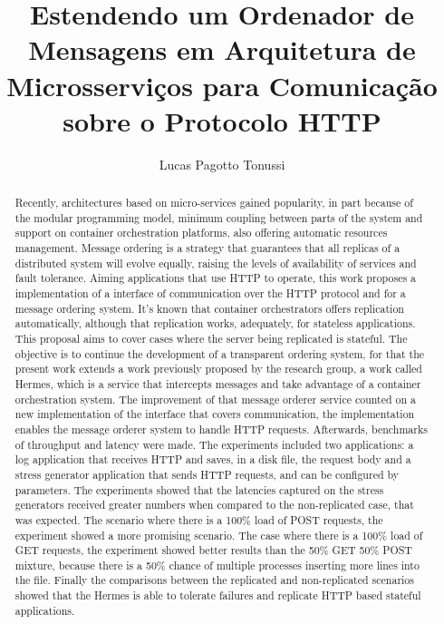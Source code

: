 \documentclass[12pt]{article}
\title{Estendendo um Ordenador de Mensagens em Arquitetura de Microsserviços para Comunicação sobre o Protocolo HTTP}
\author{Lucas Pagotto Tonussi\inst{1} }
\begin{document}
 

\maketitle

\begin{abstract}
Recently, architectures based on micro-services gained popularity, in part because of the modular programming model, minimum coupling between parts of the system and support on container orchestration platforms, also offering automatic resources management. Message ordering is a strategy that guarantees that all replicas of a distributed system will evolve equally, raising the levels of availability of services and fault tolerance. Aiming applications that use {HTTP} to operate, this work proposes a implementation of a interface of communication over the {HTTP} protocol and for a message ordering system. It's known that container orchestrators offers replication automatically, although that replication works, adequately, for stateless applications. This proposal aims to cover cases where the server being replicated is stateful. The objective is to continue the development of a transparent ordering system, for that the present work extends a work previously proposed by the research group, a work called Hermes, which is a service that intercepts messages and take advantage of a container orchestration system. The improvement of that message orderer service counted on a new implementation of the interface that covers communication, the implementation enables the message orderer system to handle {HTTP} requests. Afterwards, benchmarks of throughput and latency were made. The experiments included two applications: a log application that receives HTTP and saves, in a disk file, the request body and a stress generator application that sends HTTP requests, and can be configured by parameters. The experiments showed that the latencies captured on the stress generators received greater numbers when compared to the non-replicated case, that was expected. The scenario where there is a 100\% load of POST requests, the experiment showed a more promising scenario. The case where there is a 100\% load of GET requests, the experiment showed better results than the 50\% GET 50\% POST mixture, because there is a 50\% chance of multiple processes inserting more lines into the file. Finally the comparisons between the replicated and non-replicated scenarios showed that the Hermes is able to tolerate failures and replicate HTTP based stateful applications.
\end{abstract}
     
\end{document}
